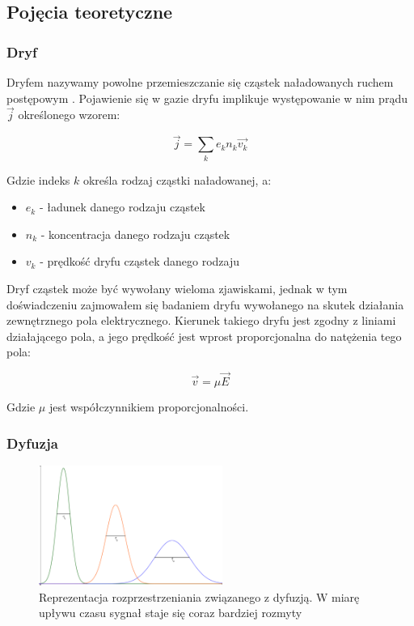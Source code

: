 \documentclass[10pt,a4paper]{article}
\begin{document}
\subsection{Pojęcia teoretyczne}

\subsubsection{Dryf}

Dryfem nazywamy powolne przemieszczanie się cząstek naładowanych ruchem postępowym \cite{opracowanie}. Pojawienie się w gazie dryfu implikuje występowanie w nim prądu $\vec{j}$ określonego wzorem\cite{dyfuzja}:

\begin{equation*}
    \vec{j} = \sum_{k}{e_k n_k \vec{v_k}}
\end{equation*}

Gdzie indeks $k$ określa rodzaj cząstki naładowanej, a:
\begin{itemize}
    \item $e_k$ - ładunek danego  rodzaju cząstek
    \item $n_k$ - koncentracja danego rodzaju cząstek
    \item $v_k$ - prędkość dryfu cząstek danego rodzaju
\end{itemize}

Dryf cząstek może być wywołany wieloma zjawiskami, jednak w tym doświadczeniu zajmowałem się badaniem dryfu wywołanego na skutek działania zewnętrznego pola elektrycznego. Kierunek takiego dryfu jest zgodny z liniami działającego pola, a jego prędkość jest wprost proporcjonalna do natężenia tego pola\cite{opracowanie}:

\begin{equation*}
    \vec{v} = \mu \vec{E}
\end{equation*}

Gdzie $\mu$ jest współczynnikiem proporcjonalności.

\newpage

\subsubsection{Dyfuzja}

\begin{figure}
    \centering
    \includegraphics[width=6cm]{diagrams/dyfuzja.pdf}
    \caption{Reprezentacja rozprzestrzeniania związanego z dyfuzją. W miarę upływu czasu sygnał staje się coraz bardziej rozmyty}
    \label{dyfuzja}
\end{figure}
\end{document}
